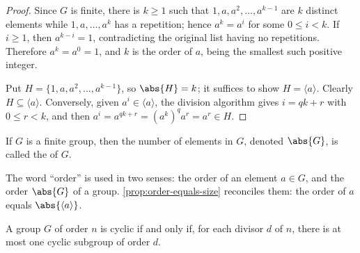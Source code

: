 \begin{proof}
	Since \(G\) is finite, there is \(k \geq 1\) such that \(1, a, a^2, \dots, a^{k-1}\) are
	\(k\) distinct elements while \(1, a, \dots, a^k\) has a repetition; hence \(a^k = a^i\)
	for some \(0 \leq i < k\). If \(i \geq 1\), then \(a^{k-i} = 1\), contradicting the
	original list having no repetitions. Therefore \(a^k = a^0 = 1\), and \(k\) is the order
	of \(a\), being the smallest such positive integer.

	Put \(H = \{1, a, a^2, \dots, a^{k-1}\}\), so \(\abs{H} = k\); it suffices to show
	\(H = \langle a\rangle\). Clearly \(H \subseteq \langle a\rangle\). Conversely, given
	\(a^i \in \langle a\rangle\), the division algorithm gives \(i = qk + r\) with
	\(0 \leq r < k\), and then
	\(a^i = a^{qk+r} = (a^k)^q a^r = a^r \in H\).
\end{proof}

\begin{definition}
	If \(G\) is a finite group, then the number of elements in \(G\), denoted \(\abs{G}\),
	is called the  of \(G\).
\end{definition}

\begin{abuse}
	The word ``order'' is used in two senses: the order of an element \(a \in G\), and the
	order \(\abs{G}\) of a group. \autoref{prop:order-equals-size} reconciles them:
	the order of \(a\) equals \(\abs{\langle a\rangle}\).
\end{abuse}

\begin{proposition}\label{prop:cyclic-criterion}
	A group \(G\) of order \(n\) is cyclic if and only if, for each divisor \(d\) of \(n\),
	there is at most one cyclic subgroup of order \(d\).
\end{proposition}

